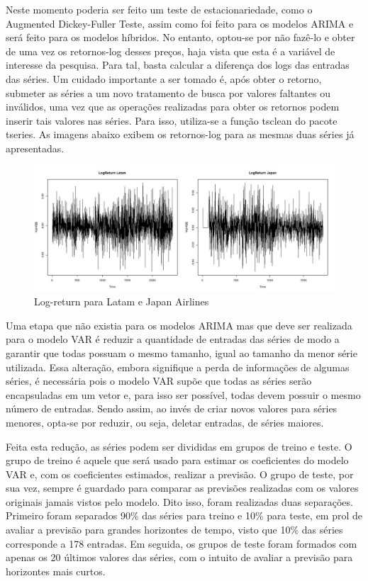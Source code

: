 \documentclass[12pt]{article}
\begin{document}
	 Neste momento poderia ser feito um teste de estacionariedade, como o \textrm{Augmented Dickey-Fuller Teste}, assim como foi feito para os modelos ARIMA e será feito para os modelos híbridos. No entanto, optou-se por não fazê-lo e obter de uma vez os retornos-log desses preços, haja vista que esta é a variável de interesse da pesquisa. Para tal, basta calcular a diferença dos logs das entradas das séries. Um cuidado importante a ser tomado é, após obter o retorno, submeter as séries a um novo tratamento de busca por valores faltantes ou inválidos, uma vez que as operações realizadas para obter os retornos podem inserir tais valores nas séries. Para isso, utiliza-se a função \textrm{tsclean} do pacote \textrm{tseries}. As imagens abaixo exibem os retornos-log para as mesmas duas séries já apresentadas.
	 
	 \begin{figure}[H]
	 	\centering
	 	\includegraphics[width=1.0\linewidth]{Imagens/LogRetVAR}
	 	\caption{Log-return para Latam e Japan Airlines}
	 	\label{fig:logretvar}
	 \end{figure}
	 
	 
	 Uma etapa que não existia para os modelos ARIMA mas que deve ser realizada para o modelo VAR é reduzir a quantidade de entradas das séries de modo a garantir que todas possuam o mesmo tamanho, igual ao tamanho da menor série utilizada. Essa alteração, embora signifique a perda de informações de algumas séries, é necessária pois o modelo VAR supõe que todas as séries serão encapsuladas em um vetor e, para isso ser possível, todas devem possuir o mesmo número de entradas. Sendo assim, ao invés de criar novos valores para séries menores, opta-se por reduzir, ou seja, deletar entradas, de séries maiores. 
	 
	 Feita esta redução, as séries podem ser divididas em grupos de treino e teste. O grupo de treino é aquele que será usado para estimar os coeficientes do modelo VAR e, com os coeficientes estimados, realizar a previsão. O grupo de teste, por sua vez, sempre é guardado para comparar as previsões realizadas com os valores originais jamais vistos pelo modelo. Dito isso, foram realizadas duas separações. Primeiro foram separados 90\% das séries para treino e 10\% para teste, em prol de avaliar a previsão para grandes horizontes de tempo, visto que 10\% das séries corresponde a 178 entradas. Em seguida, os grupos de teste foram formados com apenas os 20 últimos valores das séries, com o intuito de avaliar a previsão para horizontes mais curtos.
	 
\end{document}
